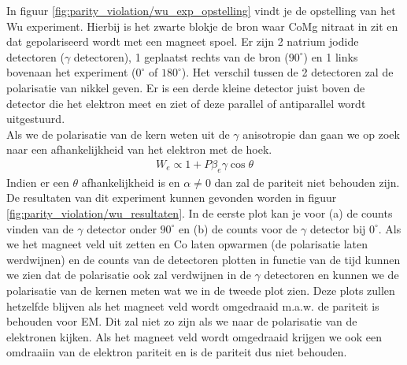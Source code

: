 \documentclass[../main.tex]{subfiles}
\begin{document}
In figuur \ref{fig:parity_violation/wu_exp_opstelling} vindt je de opstelling van het Wu experiment. Hierbij is het zwarte blokje de bron waar CoMg nitraat in zit en dat gepolariseerd wordt met een magneet spoel. Er zijn 2 natrium jodide detectoren ($\gamma$ detectoren), 1 geplaatst rechts van de bron ($90^\circ$) en 1 links bovenaan het experiment ($0^\circ$ of $180^\circ$). Het verschil tussen de 2 detectoren zal de polarisatie van nikkel geven. Er is een derde kleine detector juist boven de detector die het elektron meet en ziet of deze parallel of antiparallel wordt uitgestuurd.\\
Als we de polarisatie van de kern weten uit de $\gamma$ anisotropie dan gaan we op zoek naar een afhankelijkheid van het elektron met de hoek.
\begin{equation}
    \begin{aligned}
        \label{eq:wu_elektron}
        W_e \propto 1 + P\beta_e\gamma\cos\theta
    \end{aligned}
\end{equation}
Indien er een $\theta$ afhankelijkheid is en $\alpha \neq 0$ dan zal de pariteit niet behouden zijn. De resultaten van dit experiment kunnen gevonden worden in figuur \ref{fig:parity_violation/wu_resultaten}. In de eerste plot kan je voor (a) de counts vinden van de $\gamma$ detector onder $90^\circ$ en (b) de counts voor de $\gamma$ detector bij $0^\circ$. Als we het magneet veld uit zetten en Co laten opwarmen (de polarisatie laten werdwijnen) en de counts van de detectoren plotten in functie van de tijd kunnen we zien dat de polarisatie ook zal verdwijnen in de $\gamma$ detectoren en kunnen we de polarisatie van de kernen meten wat we in de tweede plot zien. Deze plots zullen hetzelfde blijven als het magneet veld wordt omgedraaid m.a.w. de pariteit is behouden voor EM. Dit zal niet zo zijn als we naar de polarisatie van de elektronen kijken. Als het magneet veld wordt omgedraaid krijgen we ook een omdraaiin van de elektron pariteit en is de pariteit dus niet behouden.
\end{document}
